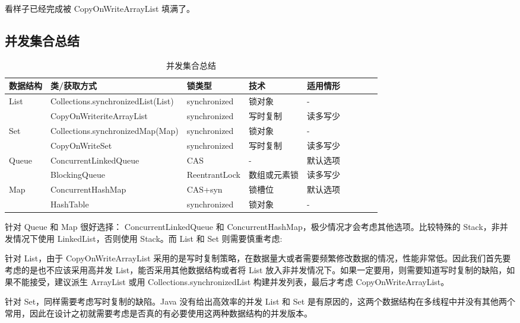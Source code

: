 看样子已经完成被 CopyOnWriteArrayList 填满了。

\subsection*{并发集合总结}

\begin{table}[H]
    \centering
    \small
    \caption{并发集合总结}
    \label{table:并发集合总结}
    \setlength{\tabcolsep}{4mm}
    \begin{tabular}{l|l|l|llllll}
        \toprule
        \textbf{数据结构} & \textbf{类/获取方式} & \textbf{锁类型} & \textbf{技术} & \textbf{适用情形} \\ 
        \midrule
        \multirow{2}{*}{List} & Collections.synchronizedList(List) & synchronized & 锁对象 & - \\
         & CopyOnWriteriteArrayList & synchronized & 写时复制 & 读多写少 \\
        \midrule
        \multirow{2}{*}{Set} & Collections.synchronizedMap(Map) & synchronized & 锁对象 & - \\
         & CopyOnWriteSet & synchronized & 写时复制 & 读多写少 \\
        \midrule
        \multirow{2}{*}{Queue} & ConcurrentLinkedQueue & CAS & - & 默认选项 \\
         & BlockingQueue & ReentrantLock & 数组或元素锁 & 读多写少 \\
         \midrule
        \multirow{2}{*}{Map} & ConcurrentHashMap & CAS+syn & 锁槽位 & 默认选项 \\
         & HashTable & synchronized & 锁对象 & - \\
          
        \bottomrule
    \end{tabular}
\end{table}

针对 Queue 和 Map 很好选择： ConcurrentLinkedQueue 和 ConcurrentHashMap，极少情况才会考虑其他选项。比较特殊的 Stack，非并发情况下使用 LinkedList，否则使用 Stack。而 List 和 Set 则需要慎重考虑:

针对 List，由于 CopyOnWriteArrayList 采用的是写时复制策略，在数据量大或者需要频繁修改数据的情况，性能非常低。因此我们首先要考虑的是也不应该采用高并发 List，能否采用其他数据结构或者将 List 放入非并发情况下。如果一定要用，则需要知道写时复制的缺陷，如果不能接受，建议派生 ArrayList 或用 Collections.synchronizedList 构建并发列表，最后才考虑 CopyOnWriteArrayList。

针对 Set，同样需要考虑写时复制的缺陷。Java 没有给出高效率的并发 List 和 Set 是有原因的，这两个数据结构在多线程中并没有其他两个常用，因此在设计之初就需要考虑是否真的有必要使用这两种数据结构的并发版本。

\newpage